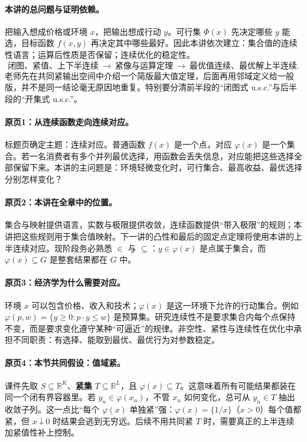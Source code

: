 \documentclass[11pt,a4paper]{article}
\newcommand{\R}{\mathbb{R}}\newcommand{\N}{\mathbb{N}}
\theoremstyle{definition}\newtheorem{definition}{定义}\newtheorem{example}{例}
\begin{document}
\paragraph{本讲的总问题与证明依赖。}
把输入想成价格或环境 $x$，把输出想成行动 $y$。可行集 $\Phi(x)$ 先决定哪些 $y$ 能选，目标函数 $f(x,y)$ 再决定其中哪些最好。因此本讲依次建立：集合值的连续性语言；运算后性质是否保留；连续优化的稳定性。
\[\text{闭图、紧值、上下半连续}\ \longrightarrow\ \text{紧像与运算定理}
\ \longrightarrow\ \text{最优值连续、最优解上半连续}.\]
老师先在共同紧输出空间中介绍一个简版最大值定理，后面再用邻域定义给一般版，并不是同一结论毫无原因地重复。特别要分清前半段的“闭图式 u.s.c.”与后半段的“开集式 u.s.c.”。


\paragraph{原页1：从连续函数走向连续对应。}标题页确定主题：连续对应。普通函数 $f(x)$ 是一个点，对应 $\varphi(x)$ 是一个集合。若一名消费者有多个并列最优选择，用函数会丢失信息，对应能把这些选择全部保留下来。本讲的主问题是：环境轻微变化时，可行集合、最高收益、最优选择分别怎样变化？



\paragraph{原页2：本讲在全章中的位置。}集合与映射提供语言，实数与极限提供收敛，连续函数提供“带入极限”的规则；本讲把这些规则用于集合值映射。下一讲的凸性和最后的固定点定理将使用本讲的上半连续对应。现阶段务必熟悉 $\in$ 与 $\subseteq$：$y\in\varphi(x)$ 是点属于集合，而 $\varphi(x)\subseteq G$ 是整套结果都在 $G$ 中。



\paragraph{原页3：经济学为什么需要对应。}环境 $x$ 可以包含价格、收入和技术；$\varphi(x)$ 是这一环境下允许的行动集合。例如 $\varphi(p,w)=\{y\ge0:p\cdot y\le w\}$ 是预算集。研究连续性不是要求集合内每个点保持不变，而是要求变化遵守某种“可逼近”的规律。非空性、紧性与连续性在优化中承担不同职责：有选择、能取到最优、最优行为对参数稳定。



\paragraph{原页4：本节共同假设：值域紧。}课件先取 $S\subseteq\R^K$、\textbf{紧集} $T\subseteq\R^L$，且 $\varphi(x)\subseteq T$。这意味着所有可能结果都装在同一个闭有界容器里。若 $y_n\in\varphi(x_n)$，不管 $x_n$ 如何变化，总可从 $y_n\in T$ 抽出收敛子列。这一点比“每个 $\varphi(x)$ 单独紧”强：$\varphi(x)=\{1/x\}$（$x>0$）每个值都紧，但 $x\downarrow0$ 时结果会逃到无穷远。后续不用共同紧 $T$ 时，需要真正的上半连续加紧值性补上控制。
\end{document}
